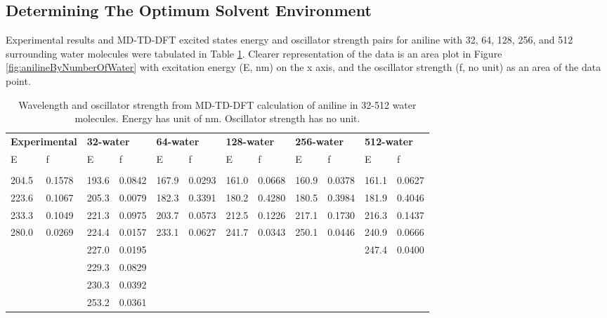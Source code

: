 \documentclass[
journal=jpcbfk, %
manuscript=article]{achemso}
\begin{document}
	\subsection{Determining The Optimum Solvent Environment} \label{step4}
	Experimental results and MD-TD-DFT excited states energy and oscillator strength pairs for aniline with 32, 64, 128, 256, and 512 surrounding water molecules were tabulated in Table \ref{Table:dataByNumberOfWater}. Clearer representation of the data is an area plot in Figure \ref{fig:anilineByNumberOfWater} with excitation energy (E, nm) on the x axis, and the oscillator strength (f, no unit) as an area of the data point.
	
	\begin{table}[ht]
		\small
		\centering
		\scriptsize
		\caption{Wavelength and oscillator strength from MD-TD-DFT calculation of aniline in 32-512 water molecules. Energy has unit of nm. Oscillator strength has no unit.}\label{Table:dataByNumberOfWater}
		\centering
		\begin{tabular}{llllllllllll}
			\multicolumn{2}{l}{\textbf{Experimental}} &
			\multicolumn{2}{l}{\textbf{32-water}} &
			\multicolumn{2}{l}{\textbf{64-water}} &
			\multicolumn{2}{l}{\textbf{128-water}} &
			\multicolumn{2}{l}{\textbf{256-water}} &
			\multicolumn{2}{l}{\textbf{512-water}}\\ [1ex]
			E    & f    & E    & f    & E    & f    & E    & f    & E    & f    & E    & f \\ [0.5ex]
			\hline\hline
			\\[-0.5ex]
			204.5	&	0.1578	&	193.6	&	0.0842	&	167.9	&	0.0293	&	161.0	&	0.0668	&	160.9	&	0.0378	&	161.1	&	0.0627 \\
			223.6	&	0.1067	&	205.3	&	0.0079	&	182.3	&	0.3391	&	180.2	&	0.4280	&	180.5	&	0.3984	&	181.9	&	0.4046 \\
			233.3	&	0.1049	&	221.3	&	0.0975	&	203.7	&	0.0573	&	212.5	&	0.1226	&	217.1	&	0.1730	&	216.3	&	0.1437 \\
			280.0	&	0.0269	&	224.4	&	0.0157	&	233.1	&	0.0627	&	241.7	&	0.0343	&	250.1	&	0.0446	&	240.9	&	0.0666 \\
			~	&	~	&	227.0	&	0.0195	&	~	&	~	&	~	&	~	&	~	&	~	&	247.4	&	0.0400 \\
			~	&	~	&	229.3	&	0.0829	&	~	&	~	&	~	&	~	&	~	&	~	&	~	&	~ \\
			~	&	~	&	230.3	&	0.0392	&	~	&	~	&	~	&	~	&	~	&	~	&	~	&	~ \\
			~	&	~	&	253.2	&	0.0361	&	~	&	~	&	~	&	~	&	~	&	~	&	~	&	~ \\
		\end{tabular}
	\end{table}
	
\end{document}
